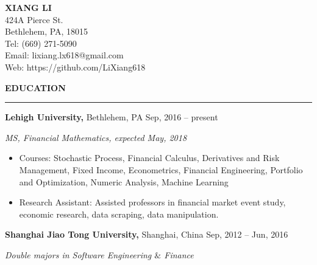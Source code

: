 \documentclass[a4paper,12pt]{report}
\newcommand{\marginAdj}{0.5in}
\begin{document}
\sloppy
{\centering
 \fontsize{12pt}{12pt}\selectfont\textbf{XIANG LI}\\
 \fontsize{11pt}{11pt}\selectfont 424A Pierce St. \\
 \fontsize{11pt}{11pt}\selectfont Bethlehem, PA, 18015 \\
 \fontsize{11pt}{11pt}\selectfont Tel: (669) 271-5090 \\
 \fontsize{11pt}{11pt}\selectfont Email: lixiang.lx618@gmail.com \\
 \fontsize{11pt}{11pt}\selectfont Web: https://github.com/LiXiang618 \\
}

\vspace{9pt}

\noindent 
\textbf{EDUCATION} \par
\vspace{2pt}
\hrule
\vspace{6pt}
\noindent 
\textbf{Lehigh University, }Bethlehem, PA{\fontsize{9pt}{9pt}\selectfont \textbf{ \hspace*{3.25in} \hspace*{\marginAdj} }{\fontsize{10pt}{10pt}\selectfont Sep, 2016 – present}} \par
\noindent 
{\fontsize{10pt}{10pt}\selectfont \textit{MS, Financial Mathematics, expected May, 2018}} \par
\noindent 
\begin{itemize}[noitemsep,topsep=0pt]
\item {\fontsize{10pt}{10pt}\selectfont Courses: Stochastic  Process, Financial Calculus, Derivatives and Risk Management, Fixed Income, Econometrics, Financial Engineering, Portfolio and Optimization, Numeric Analysis, Machine Learning} \par
\noindent 
\item {\fontsize{10pt}{10pt}\selectfont Research Assistant: Assisted professors in financial market event study, economic research, data scraping, data manipulation.}\end{itemize}
 \par
\noindent 
\textbf{Shanghai Jiao Tong University, }Shanghai, China{\fontsize{9pt}{9pt}\selectfont  \hspace*{2.15in} \hspace*{\marginAdj} {\fontsize{10pt}{10pt}\selectfont Sep, 2012 – Jun, 2016}} \par
\noindent 
{\fontsize{10pt}{10pt}\selectfont \textit{Double majors in Software Engineering  $  \&  $ Finance}} \par
\end{document}
